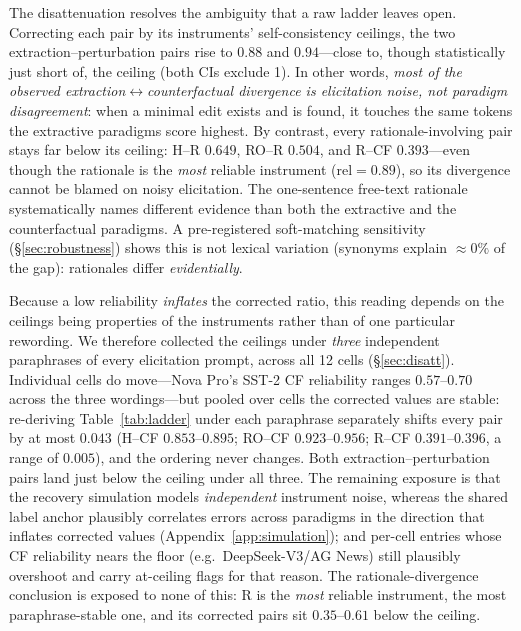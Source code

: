 \documentclass[11pt]{article}
\begin{document}
The disattenuation resolves the ambiguity that a raw ladder leaves open. Correcting each pair by its instruments' self-consistency ceilings, the two extraction--perturbation pairs rise to $0.88$ and $0.94$---close to, though statistically just short of, the ceiling (both CIs exclude 1). In other words, \emph{most of the observed extraction$\leftrightarrow$counterfactual divergence is elicitation noise, not paradigm disagreement}: when a minimal edit exists and is found, it touches the same tokens the extractive paradigms score highest. By contrast, every rationale-involving pair stays far below its ceiling: H--R $0.649$, RO--R $0.504$, and R--CF $0.393$---even though the rationale is the \emph{most} reliable instrument ($\mathrm{rel}=0.89$), so its divergence cannot be blamed on noisy elicitation. The one-sentence free-text rationale systematically names different evidence than both the extractive and the counterfactual paradigms. A pre-registered soft-matching sensitivity (\S\ref{sec:robustness}) shows this is not lexical variation (synonyms explain ${\approx}0\%$ of the gap): rationales differ \emph{evidentially}.

Because a low reliability \emph{inflates} the corrected ratio, this reading depends on the ceilings being properties of the instruments rather than of one particular rewording. We therefore collected the ceilings under \emph{three} independent paraphrases of every elicitation prompt, across all 12 cells (\S\ref{sec:disatt}). Individual cells do move---Nova Pro's SST-2 CF reliability ranges $0.57$--$0.70$ across the three wordings---but pooled over cells the corrected values are stable: re-deriving Table~\ref{tab:ladder} under each paraphrase separately shifts every pair by at most $0.043$ (H--CF $0.853$--$0.895$; RO--CF $0.923$--$0.956$; R--CF $0.391$--$0.396$, a range of $0.005$), and the ordering never changes. Both extraction--perturbation pairs land just below the ceiling under all three. The remaining exposure is that the recovery simulation models \emph{independent} instrument noise, whereas the shared label anchor plausibly correlates errors across paradigms in the direction that inflates corrected values (Appendix~\ref{app:simulation}); and per-cell entries whose CF reliability nears the floor (e.g.\ DeepSeek-V3/AG News) still plausibly overshoot and carry at-ceiling flags for that reason. The rationale-divergence conclusion is exposed to none of this: R is the \emph{most} reliable instrument, the most paraphrase-stable one, and its corrected pairs sit $0.35$--$0.61$ below the ceiling.
\end{document}
